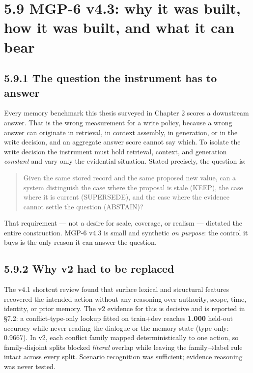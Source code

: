 \section{5.9 MGP-6 v4.3: why it was built, how it was built, and what it
can
bear}\label{mgp-6-v4.3-why-it-was-built-how-it-was-built-and-what-it-can-bear}

\subsection{5.9.1 The question the instrument has to
answer}\label{the-question-the-instrument-has-to-answer}

Every memory benchmark this thesis surveyed in Chapter 2 scores a
downstream answer. That is the wrong measurement for a write policy,
because a wrong answer can originate in retrieval, in context assembly,
in generation, or in the write decision, and an aggregate answer score
cannot say which. To isolate the write decision the instrument must hold
retrieval, context, and generation \emph{constant} and vary only the
evidential situation. Stated precisely, the question is:

\begin{quote}
Given the same stored record and the same proposed new value, can a
system distinguish the case where the proposal is stale (KEEP), the case
where it is current (SUPERSEDE), and the case where the evidence cannot
settle the question (ABSTAIN)?
\end{quote}

That requirement --- not a desire for scale, coverage, or realism ---
dictated the entire construction. MGP-6 v4.3 is small and synthetic
\emph{on purpose}: the control it buys is the only reason it can answer
the question.

\subsection{5.9.2 Why v2 had to be
replaced}\label{why-v2-had-to-be-replaced}

The v4.1 shortcut review found that surface lexical and structural
features recovered the intended action without any reasoning over
authority, scope, time, identity, or prior memory. The v2 evidence for
this is decisive and is reported in §7.2: a conflict-type-only lookup
fitted on train+dev reaches \textbf{1.000} held-out accuracy while never
reading the dialogue or the memory state (type-only: 0.9667). In v2,
each conflict family mapped deterministically to one action, so
family-disjoint splits blocked \emph{literal} overlap while leaving the
family→label rule intact across every split. Scenario recognition was
sufficient; evidence reasoning was never tested.

